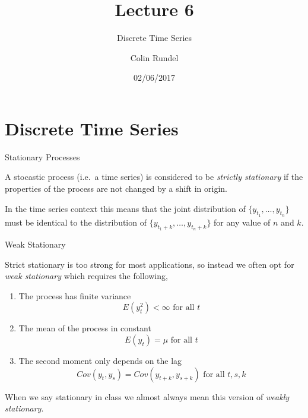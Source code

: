 \documentclass[11pt,ignorenonframetext,]{beamer}
\title{Lecture 6}
\subtitle{Discrete Time Series}
\author{Colin Rundel}
\date{02/06/2017}
\begin{document}
\frame{\titlepage}

\section{Discrete Time Series}\label{discrete-time-series}

\begin{frame}[t]{Stationary Processes}

A stocastic process (i.e.~a time series) is considered to be
\emph{strictly stationary} if the properties of the process are not
changed by a shift in origin.

\pause

In the time series context this means that the joint distribution of
\(\{y_{t_1}, \ldots, y_{t_n}\}\) must be identical to the distribution
of \(\{y_{t_1+k}, \ldots, y_{t_n+k}\}\) for any value of \(n\) and
\(k\).

\pause

\end{frame}

\begin{frame}[t]{Weak Stationary}

Strict stationary is too strong for most applications, so instead we
often opt for \emph{weak stationary} which requires the following,

\begin{enumerate}
\def\labelenumi{\arabic{enumi}.}
\item
  The process has finite variance
  \[E(y_t^2) < \infty \text{ for all $t$}\]
\item
  The mean of the process in constant
  \[E(y_t) = \mu \text{ for all $t$}\]
\item
  The second moment only depends on the lag
  \[Cov(y_t,y_s) = Cov(y_{t+k},y_{s+k}) \text{ for all $t,s,k$}\]
\end{enumerate}

\pause

When we say stationary in class we almost always mean this version of
\emph{weakly stationary}.

\end{frame}
\end{document}
